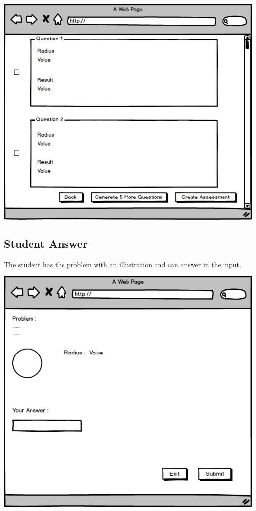 \documentclass{article}
\begin{document}
\begin{center}
    \includegraphics[scale=0.5]{Questions_generated_choice.png}
\end{center}
\subsection{Student Answer}
The student has the problem with an illustration and can answer in the input.\\

\begin{center}
    \includegraphics[scale=0.5]{Student_Answer.png}
\end{center}
\end{document}
